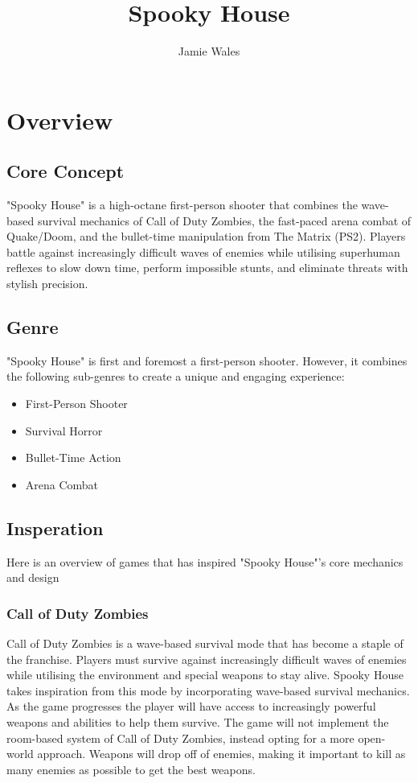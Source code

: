 \documentclass{article}
\title{Spooky House}
\author{Jamie Wales}
\begin{document}
    \maketitle


    \section{Overview}\label{sec:introduction}

    \subsection{Core Concept}
    "Spooky House" is a high-octane first-person shooter that combines the wave-based survival mechanics of Call of Duty Zombies, the fast-paced arena combat of Quake/Doom, and the bullet-time manipulation from The Matrix (PS2). Players battle against increasingly difficult waves of enemies while utilising superhuman reflexes to slow down time, perform impossible stunts, and eliminate threats with stylish precision.

    \subsection{Genre}
    "Spooky House" is first and foremost a first-person shooter. However, it combines the following sub-genres to create a unique and engaging experience:
    \begin{itemize}
        \item First-Person Shooter
        \item Survival Horror
        \item Bullet-Time Action
        \item Arena Combat
    \end{itemize}

    \subsection{Insperation}
    Here is an overview of games that has inspired "Spooky House"'s core mechanics and design

    \subsubsection{Call of Duty Zombies}
    Call of Duty Zombies is a wave-based survival mode that has become a staple of the franchise.
    Players must survive against increasingly difficult waves of enemies while utilising the environment and special weapons to stay alive.
    Spooky House takes inspiration from this mode by incorporating wave-based survival mechanics.
    As the game progresses the player will have access to increasingly powerful weapons and abilities to help them survive.
    The game will not implement the room-based system of Call of Duty Zombies, instead opting for a more open-world approach.
    Weapons will drop off of enemies, making it important to kill as many enemies as possible to get the best weapons.
\end{document}
